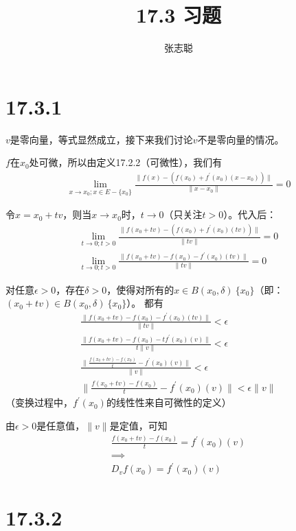 \documentclass{article}
\begin{document}
\title{17.3 习题}
\author{张志聪}
\maketitle

\section*{17.3.1}

$v$是零向量，等式显然成立，接下来我们讨论$v$不是零向量的情况。

$f$在$x_0$处可微，所以由定义17.2.2（可微性），我们有
\begin{align*}
  \lim\limits_{x \to x_0; x \in E - \{x_0\}} \frac{\|f(x) - (f(x_0) + f^\prime(x_0)(x- x_0)) \|}{\|x-x_0\|} = 0
\end{align*}

令$x = x_0 + tv$，则当$x \to x_0$时，$t \to 0$（只关注$t > 0$）。代入后：
\begin{align*}
  \lim\limits_{t \to 0; t > 0} \frac{\|f(x_0 + tv) - (f(x_0) + f^\prime(x_0)(tv)) \|}{\|tv\|} = 0 \\
  \lim\limits_{t \to 0; t > 0} \frac{\|f(x_0 + tv) - f(x_0) - f^\prime(x_0)(tv)\|}{\|tv\|} = 0    
\end{align*}

对任意$\epsilon > 0$，存在$\delta > 0$，使得对所有的$x \in B(x_0, \delta) \ \{x_0\}$（即：$(x_0 + tv) \in B(x_0, \delta) \ \{x_0\}$）。
都有
\begin{align*}
  \frac{\|f(x_0 + tv) - f(x_0) - f^\prime(x_0)(tv)\|}{\|tv\|} < \epsilon         \\
  \frac{\|f(x_0 + tv) - f(x_0) - tf^\prime(x_0)(v)\|}{t\|v\|} < \epsilon         \\
  \frac{\|\frac{f(x_0 + tv) - f(x_0)}{t} - f^\prime(x_0)(v)\|}{\|v\|} < \epsilon \\
  \|\frac{f(x_0 + tv) - f(x_0)}{t} - f^\prime(x_0)(v)\| < \epsilon \|v\|
\end{align*}
（变换过程中，$f^\prime(x_0)$的线性性来自可微性的定义）

由$\epsilon > 0$是任意值，$\|v\|$是定值，可知
\begin{align*}
  \frac{f(x_0 + tv) - f(x_0)}{t} = f^\prime(x_0)(v) \\
  \implies                                          \\
  D_vf(x_0) = f^\prime(x_0)(v)
\end{align*}

\section*{17.3.2}
\end{document}
